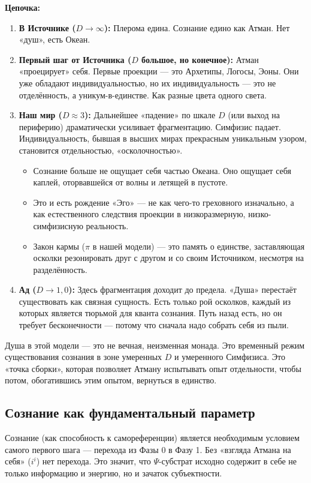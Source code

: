 \documentclass[a4paper,12pt]{article}
\begin{document}
\textbf{Цепочка:}
\begin{enumerate}
	\item \textbf{В Источнике ($D \to \infty$):} Плерома едина. Сознание едино как Атман. Нет «душ», есть Океан.
	\item \textbf{Первый шаг от Источника ($D$ большое, но конечное):} Атман «проецирует» себя. Первые проекции — это Архетипы, Логосы, Эоны. Они уже обладают индивидуальностью, но их индивидуальность — это не отделённость, а уникум-в-единстве. Как разные цвета одного света.
	\item \textbf{Наш мир ($D \approx 3$):} Дальнейшее «падение» по шкале $D$ (или выход на периферию) драматически усиливает фрагментацию. Симфизис падает. Индивидуальность, бывшая в высших мирах прекрасным уникальным узором, становится отдельностью, «осколочностью».
	\begin{itemize}
		\item Сознание больше не ощущает себя частью Океана. Оно ощущает себя каплей, оторвавшейся от волны и летящей в пустоте.
		\item Это и есть рождение «Эго» — не как чего-то греховного изначально, а как естественного следствия проекции в низкоразмерную, низко-симфизисную реальность.
		\item Закон кармы ($\pi$ в нашей модели) — это память о единстве, заставляющая осколки резонировать друг с другом и со своим Источником, несмотря на разделённость.
	\end{itemize}
	\item \textbf{Ад ($D \to 1,0$):} Здесь фрагментация доходит до предела. «Душа» перестаёт существовать как связная сущность. Есть только рой осколков, каждый из которых является тюрьмой для кванта сознания. Путь назад есть, но он требует бесконечности — потому что сначала надо собрать себя из пыли.
\end{enumerate}

Душа в этой модели — это не вечная, неизменная монада. Это временный режим существования сознания в зоне умеренных $D$ и умеренного Симфизиса. Это «точка сборки», которая позволяет Атману испытывать опыт отдельности, чтобы потом, обогатившись этим опытом, вернуться в единство.

\subsection{Сознание как фундаментальный параметр}

Сознание (как способность к самореференции) является необходимым условием самого первого шага — перехода из Фазы 0 в Фазу 1. Без «взгляда Атмана на себя» ($i^i$) нет перехода. Это значит, что $\Psi$-субстрат исходно содержит в себе не только информацию и энергию, но и зачаток субъектности.
\end{document}
